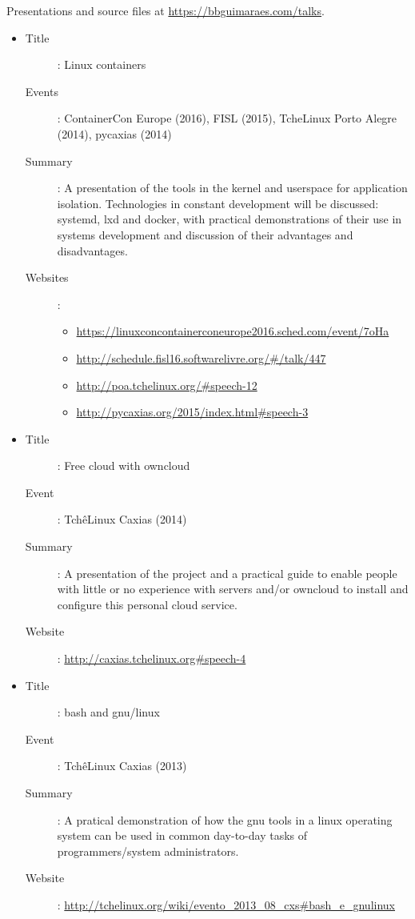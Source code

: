 Presentations and source files at \url{https://bbguimaraes.com/talks}.

\begin{itemize}
    \item
        \begin{description}
            \item[Title]: Linux containers
            \item[Events]:
                ContainerCon Europe (2016), FISL (2015), TcheLinux Porto Alegre
                (2014), pycaxias (2014)
            \item[Summary]:
                A presentation of the tools in the kernel and userspace for
                application isolation. Technologies in constant development
                will be discussed: systemd, lxd and docker, with practical
                demonstrations of their use in systems development and
                discussion of their advantages and disadvantages.
            \item[Websites]:
                \begin{itemize}
                    \item \url{https://linuxconcontainerconeurope2016.sched.com/event/7oHa}
                    \item \url{http://schedule.fisl16.softwarelivre.org/#/talk/447}
                    \item \url{http://poa.tchelinux.org/#speech-12}
                    \item \url{http://pycaxias.org/2015/index.html#speech-3}
                \end{itemize}
        \end{description}
    \item
        \begin{description}
            \item[Title]: Free cloud with owncloud
            \item[Event]: TchêLinux Caxias (2014)
            \item[Summary]:
                A presentation of the project and a practical guide to enable
                people with little or no experience with servers and/or
                owncloud to install and configure this personal cloud service.
            \item[Website]: \url{http://caxias.tchelinux.org#speech-4}
        \end{description}
    \item
        \begin{description}
            \item[Title]: bash and gnu/linux
            \item[Event]: TchêLinux Caxias (2013)
            \item[Summary]:
                A pratical demonstration of how the gnu tools in a linux
                operating system can be used in common day-to-day tasks of
                programmers/system administrators.
            \item[Website]:
                \url{http://tchelinux.org/wiki/evento_2013_08_cxs#bash_e_gnulinux}
        \end{description}
\end{itemize}

